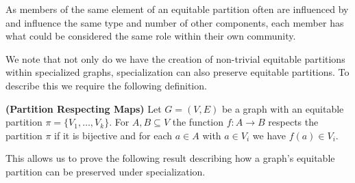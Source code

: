 \documentclass[12pt]{thesis}
\begin{document}
As members of the same element of an equitable partition often are influenced by and influence the same type and number of other components, each member has what could be considered the same {role} within their own community.


We note that not only do we have the creation of non-trivial equitable partitions within specialized graphs, specialization can also preserve equitable partitions.
To describe this we require the following definition.  

\begin{definition}\textbf{(Partition Respecting Maps)}
Let $G=(V,E)$ be a graph with an equitable partition $\pi=\{V_1,\dots,V_k\}$.
For $A,B\subseteq V$ the function $f:A\to B$ {respects} the partition $\pi$ if it is bijective and for each $a\in A$ with $a\in V_i$ we have $f(a)\in V_i$.
\end{definition}

This allows us to prove the following result describing how a graph's equitable partition can be preserved under specialization.

\end{document}
